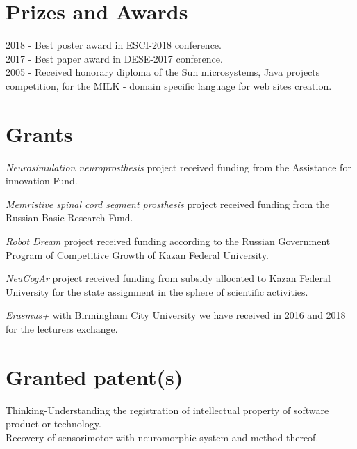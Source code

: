 \documentclass{moderncv}
\begin{document}

\section{Prizes and Awards}

2018 - Best poster award in ESCI-2018 conference.\\
2017 - Best paper award in DESE-2017 conference.\\
2005 - Received honorary diploma of the Sun microsystems, Java projects competition, for the MILK - domain specific language for web sites creation.\\

\section{Grants}

\emph{Neurosimulation neuroprosthesis} project received funding from the Assistance for innovation Fund.

\emph{Memristive spinal cord segment prosthesis} project received funding from the Russian Basic Research Fund.

\emph{Robot Dream} project received funding according to the Russian Government Program of Competitive Growth of Kazan Federal University.

\emph{NeuCogAr} project received funding from subsidy allocated to Kazan Federal University for the state assignment in the sphere of scientific activities.

\emph{Erasmus+} with Birmingham City University we have received in 2016 and 2018 for the lecturers exchange. 

\section{Granted patent(s)}

Thinking-Understanding the registration of intellectual property of software product or technology.\\
Recovery of sensorimotor  with neuromorphic system and method thereof.
\end{document}

